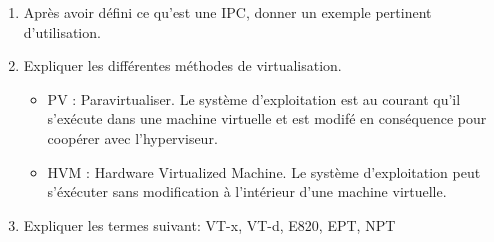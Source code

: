\begin{enumerate}

\item Après avoir défini ce qu'est une IPC, donner un exemple pertinent d'utilisation.

\item Expliquer les différentes méthodes de virtualisation.

\begin{correction}
\begin{itemize}
\item PV : Paravirtualiser. Le système d'exploitation est au courant qu'il s'exécute dans une machine virtuelle et est modifé en conséquence pour coopérer avec l'hyperviseur.
\item HVM : Hardware Virtualized Machine. Le système d'exploitation peut s'éxécuter sans modification à l'intérieur d'une machine virtuelle.
\end{itemize}
\end{correction}


\item Expliquer les termes suivant: VT-x, VT-d, E820, EPT, NPT

\end{enumerate}



